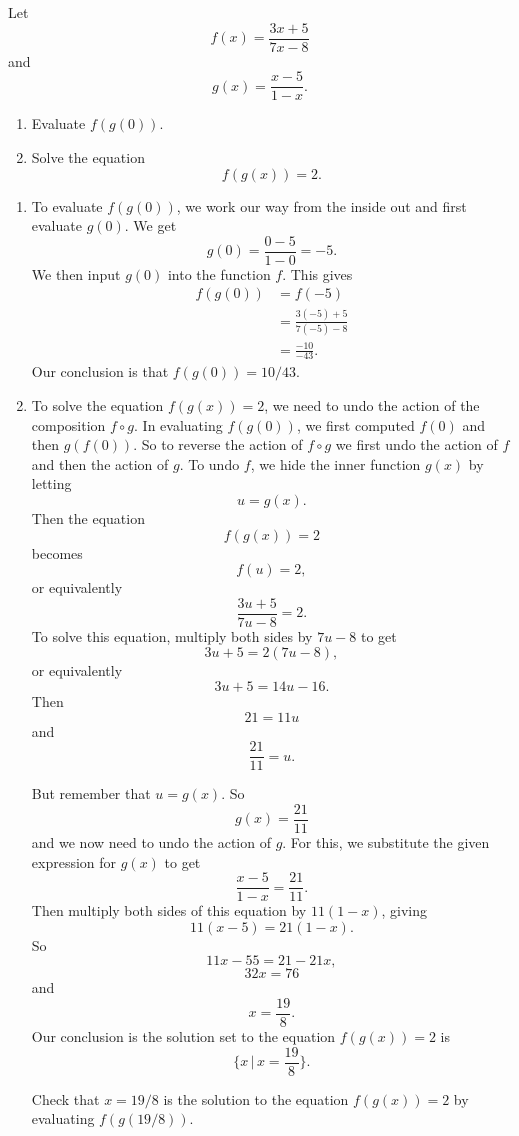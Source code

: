 \documentclass{ximera}
\begin{document}
\begin{example} \label{E4433mzz}
Let
\[
  f(x)  = \frac{3x+5}{7x-8}
\]
and
\[
   g(x) = \frac{x-5}{1-x}.
\]

\begin{enumerate}
\item Evaluate $f(g(0))$.

\item Solve the equation 
\[
    f(g(x)) = 2.
\]
\end{enumerate}

\begin{explanation}
\begin{enumerate}
\item To evaluate $f(g(0))$, we work our way from the inside out and first evaluate $g(0)$. We get
\[
 g(0) = \frac{0-5}{1-0} = -5.
\]
We then input $g(0)$ into the function $f$. This gives
\begin{align*}
   f(g(0)) &= f(-5) \\
             &= \frac{3(-5) + 5}{7(-5) - 8} \\
              & = \frac{-10}{-43} .
\end{align*}
Our conclusion is that $f(g(0)) =10/43$. 

\item To solve the equation $f(g(x))=2$, we need to undo the action of the composition $f\circ g$. In evaluating $f(g(0))$, we first computed $f(0)$ and then $g(f(0))$. So to reverse the action of $f\circ g$ we first undo the action of $f$ and then the action of $g$. To undo $f$, we hide the inner function $g(x)$ by letting
\[
      u  = g(x).
\] 
Then the equation 
\[
  f(g(x)) =2
\]
becomes
\[
    f(u) = 2,
\]
or equivalently
\[
          \frac{3u+5}{7u-8} = 2.
\]
To solve this equation, multiply both sides by $7u-8$ to get
\[
 3u+5 = 2(7u-8),
\]
or equivalently
\[
3u + 5 = 14u - 16.
\]
Then 
\[
 21 = 11u
\]
and 
\[
 \frac{21}{11} = u.
\]

But remember that $u=g(x)$. So
\[
   g(x) = \frac{21}{11}
\]
and we now need to undo the action of $g$. For this, we substitute the given expression for $g(x)$ to get
\[
   \frac{x-5}{1-x} = \frac{21}{11}.
\]
Then multiply both sides of this equation by $11(1-x)$, giving
\[
  11(x-5) = 21(1-x).
\]
So
\[
 11x - 55 = 21 - 21x,
\]
\[
   32x = 76
\]
and 
\[
  x = \frac{19}{8} .
\]
Our conclusion is the solution set to the equation $f(g(x))= 2$ is
\[
    \{  x \, | \, x = \frac{19}{8} \}.
\]
\begin{question} \label{Q2321}
Check that $x=19/8$ is the solution to the equation $f(g(x))=2$ by evaluating $f(g(19/8))$.
\end{question}
\end{enumerate}

\end{explanation}
\end{example}
\end{document}
